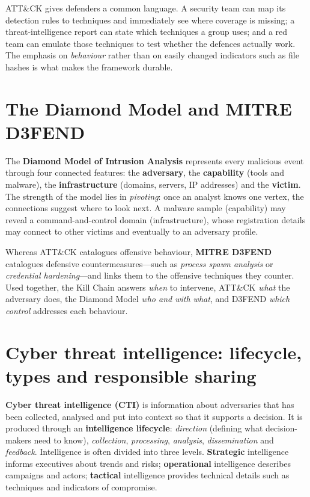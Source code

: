 \documentclass[11pt,openany]{book}
\begin{document}
ATT\&CK gives defenders a common language. A security team can map its detection rules to techniques and immediately see where coverage is missing; a threat-intelligence report can state which techniques a group uses; and a red team can emulate those techniques to test whether the defences actually work. The emphasis on \emph{behaviour} rather than on easily changed indicators such as file hashes is what makes the framework durable.

\section{The Diamond Model and MITRE D3FEND}\label{sec:3.5}
The \textbf{Diamond Model of Intrusion Analysis} represents every malicious event through four connected features: the \textbf{adversary}, the \textbf{capability} (tools and malware), the \textbf{infrastructure} (domains, servers, IP addresses) and the \textbf{victim}. The strength of the model lies in \emph{pivoting}: once an analyst knows one vertex, the connections suggest where to look next. A malware sample (capability) may reveal a command-and-control domain (infrastructure), whose registration details may connect to other victims and eventually to an adversary profile.

Whereas ATT\&CK catalogues offensive behaviour, \textbf{MITRE D3FEND} catalogues defensive countermeasures—such as \emph{process spawn analysis} or \emph{credential hardening}—and links them to the offensive techniques they counter. Used together, the Kill Chain answers \emph{when} to intervene, ATT\&CK \emph{what} the adversary does, the Diamond Model \emph{who and with what}, and D3FEND \emph{which control} addresses each behaviour.

\section{Cyber threat intelligence: lifecycle, types and responsible sharing}\label{sec:3.6}
\textbf{Cyber threat intelligence (CTI)} is information about adversaries that has been collected, analysed and put into context so that it supports a decision. It is produced through an \textbf{intelligence lifecycle}: \emph{direction} (defining what decision-makers need to know), \emph{collection}, \emph{processing}, \emph{analysis}, \emph{dissemination} and \emph{feedback}. Intelligence is often divided into three levels. \textbf{Strategic} intelligence informs executives about trends and risks; \textbf{operational} intelligence describes campaigns and actors; \textbf{tactical} intelligence provides technical details such as techniques and indicators of compromise.
\end{document}
